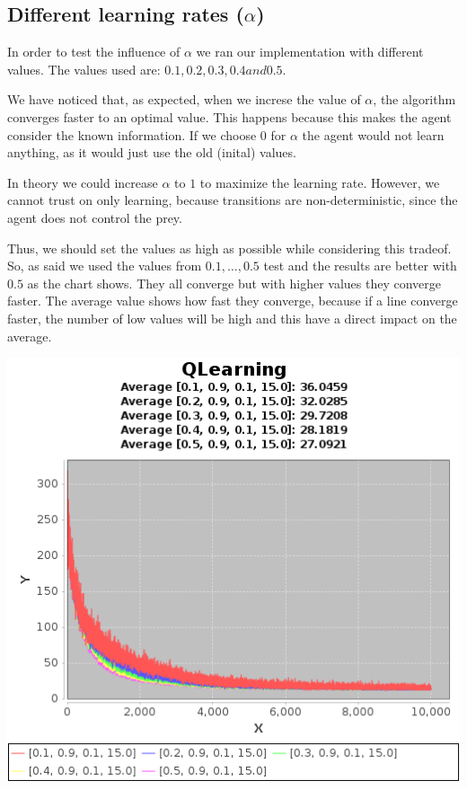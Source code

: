 \documentclass{article}
\begin{document}
\subsection{Different learning rates ($\alpha$)}
In order to test the influence of $\alpha$ we ran our implementation with
different values. The values used are:
$0.1 , 0.2, 0.3, 0.4 and 0.5$. 

We have noticed that, as expected, when we increse the value of $\alpha$, the 
algorithm converges faster to an optimal value. This happens because this makes the agent
consider the known information. If we choose $0$ for $\alpha$ the agent
would not learn anything, as it would just use the old (inital) values.

In theory we could increase $\alpha$ to $1$ to maximize the learning rate. However, we cannot trust on only learning, because transitions are non-deterministic, since the agent does not control the prey.

Thus, we should set the values as high as possible while considering this tradeof.
So, as said we used the values from $0.1, \ldots , 0.5$ test and the results are
better with $0.5$ as the chart shows. They all converge but with higher values
they converge faster. The average value shows how fast they converge, because if
a line converge faster, the number of low values will be high and this have a
direct impact on the average.

\includegraphics[]{res/alpha_01_to_05_gama_09_epsilon_01_IV_15.png}
\end{document}
